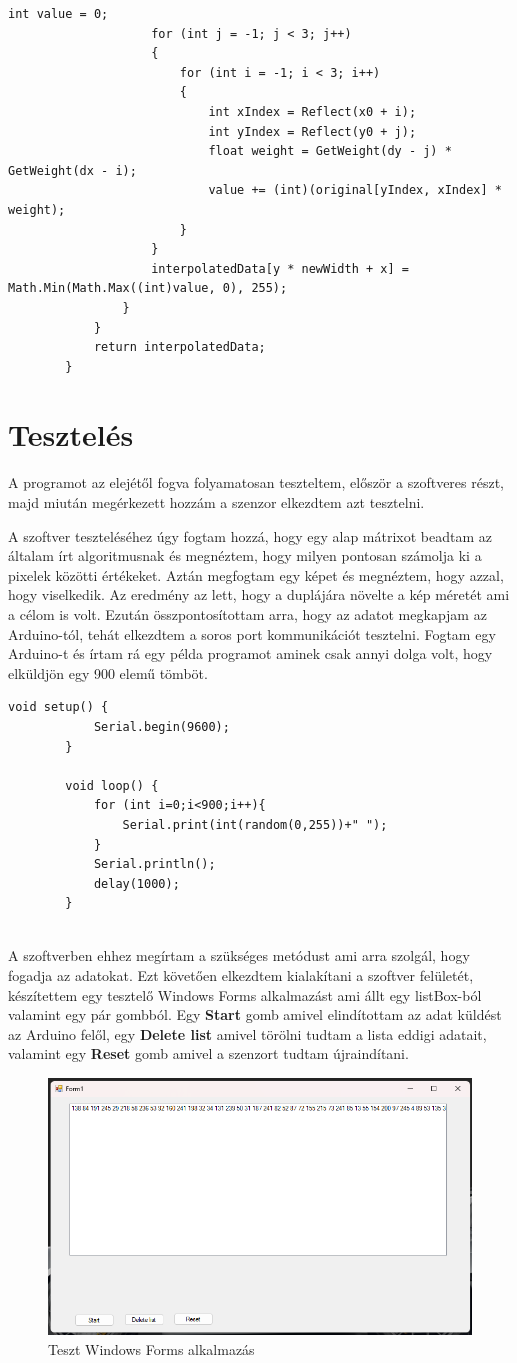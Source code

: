 \documentclass[]{thesis-ekf}
\theoremstyle{definition}
\theoremstyle{remark}
\begin{document}
				\begin{lstlisting}[language=CSharp]
					int value = 0;
					for (int j = -1; j < 3; j++)
					{
						for (int i = -1; i < 3; i++)
						{
							int xIndex = Reflect(x0 + i);
							int yIndex = Reflect(y0 + j);
							float weight = GetWeight(dy - j) * GetWeight(dx - i);
							value += (int)(original[yIndex, xIndex] * weight);
						}
					}
					interpolatedData[y * newWidth + x] = Math.Min(Math.Max((int)value, 0), 255);
				}
			}
			return interpolatedData;
		}	
	\end{lstlisting}
	\chapter{Tesztelés}
	A programot az elejétől fogva folyamatosan teszteltem, először a szoftveres részt, majd miután megérkezett hozzám a szenzor elkezdtem azt tesztelni. 
	
	A szoftver teszteléséhez úgy fogtam hozzá, hogy egy alap mátrixot beadtam az általam írt algoritmusnak és megnéztem, hogy milyen pontosan számolja ki a pixelek közötti értékeket. Aztán megfogtam egy képet és megnéztem, hogy azzal, hogy viselkedik. Az eredmény az lett, hogy a duplájára növelte a kép méretét ami a célom is volt. Ezután összpontosítottam arra, hogy az adatot megkapjam az Arduino-tól, tehát elkezdtem a soros port kommunikációt tesztelni. Fogtam egy Arduino-t és írtam rá egy példa programot aminek csak annyi dolga volt, hogy elküldjön egy 900 elemű tömböt.
	
	\begin{lstlisting}[language=Arduino]
		void setup() {
			Serial.begin(9600);
		}
		
		void loop() {
			for (int i=0;i<900;i++){
				Serial.print(int(random(0,255))+" ");
			} 
			Serial.println();
			delay(1000);
		}
		
	\end{lstlisting}
	
	A szoftverben ehhez megírtam a szükséges metódust ami arra szolgál, hogy fogadja az adatokat. Ezt követően elkezdtem kialakítani a szoftver felületét, készítettem egy tesztelő Windows Forms alkalmazást ami állt egy listBox-ból valamint egy pár gombból. Egy \textbf{Start} gomb amivel elindítottam az adat küldést az Arduino felől, egy \textbf{Delete list} amivel törölni tudtam a lista eddigi adatait, valamint egy \textbf{Reset} gomb amivel a szenzort tudtam újraindítani. 
	\pagebreak
	\begin{figure}[th!]
		\centering
		\includegraphics[width=0.7\linewidth]{tesztalkalmazas}
		\caption[Teszt alkalmazás]{Teszt Windows Forms alkalmazás}
		\label{fig:tesztalkalmazas}
	\end{figure}
	
\end{document}
